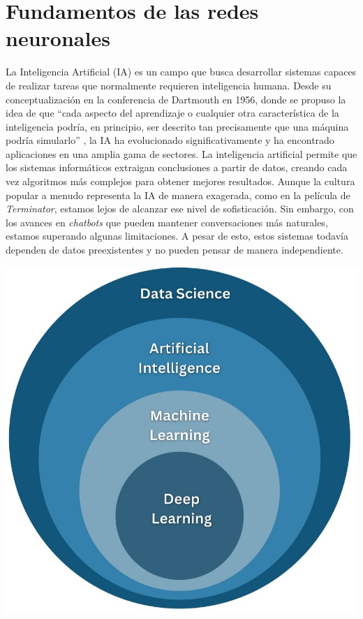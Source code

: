 \chapter{Fundamentos de las redes neuronales} \label{Capitulo_2}


\begin{minipage}{0.65\textwidth}
La Inteligencia Artificial (IA) es un campo que busca desarrollar sistemas capaces de realizar tareas que normalmente requieren inteligencia humana.  Desde su conceptualización en la conferencia de Dartmouth en 1956, donde se propuso la idea de que ``cada aspecto del aprendizaje o cualquier otra característica de la inteligencia podría, en principio, ser descrito tan precisamente que una máquina podría simularlo'' \citep{moor2006dartmouth}, la IA ha evolucionado significativamente y ha encontrado aplicaciones en una amplia gama de sectores. La inteligencia artificial permite que los sistemas informáticos extraigan conclusiones a partir de datos, creando cada vez algoritmos más complejos para obtener mejores resultados. Aunque la cultura popular a menudo representa la IA de manera exagerada, como en la película de \textit{Terminator}, estamos lejos de alcanzar ese nivel de sofisticación. Sin embargo, con los avances en \textit{chatbots} que pueden mantener conversaciones más naturales, estamos superando algunas limitaciones. A pesar de esto, estos sistemas todavía dependen de datos preexistentes y no pueden pensar de manera independiente.
\end{minipage}
\begin{minipage}{0.05\textwidth}
\textbf{ }
\end{minipage}
\begin{minipage}{0.3\textwidth}
    \includegraphics[width=1.1\textwidth]{img/ia.jpg}
    \label{fig: ia}
\end{minipage}


